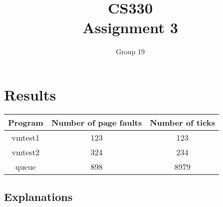 \documentclass{article}
\author{Group 19}
\title{CS330 \\ Assignment 3}
\date{}
\begin{document}
\maketitle

\section{Results}
\begin{center}
\begin{tabular}{| c | c | c |}
\hline
\textbf{Program} & \textbf{Number of page faults} & \textbf{Number of ticks}\\
\hline
vmtest1 & 123 & 123 \\
\hline
vmtest2 & 324 & 234 \\
\hline
queue & 898 & 8979 \\
\hline
\end{tabular}
\end{center}
\subsection{Explanations}
\end{document}
